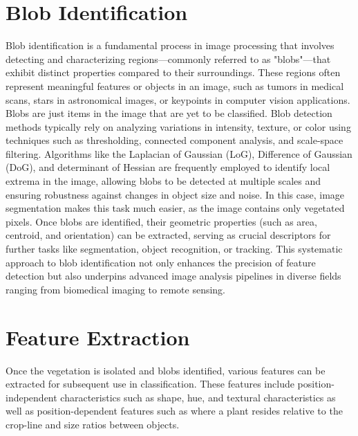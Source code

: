 \documentclass[letterpaper]{report}
\begin{document}
{\section{Blob Identification}
Blob identification is a fundamental process in image processing that involves detecting and characterizing regions—commonly referred to as "blobs"—that exhibit distinct properties compared to their surroundings. These regions often represent meaningful features or objects in an image, such as tumors in medical scans, stars in astronomical images, or keypoints in computer vision applications. Blobs are just items in the image that are yet to be classified.  Blob detection methods typically rely on analyzing variations in intensity, texture, or color using techniques such as thresholding, connected component analysis, and scale-space filtering. Algorithms like the Laplacian of Gaussian (LoG), Difference of Gaussian (DoG), and determinant of Hessian are frequently employed to identify local extrema in the image, allowing blobs to be detected at multiple scales and ensuring robustness against changes in object size and noise. In this case, image segmentation makes this task much easier, as the image contains only vegetated pixels. Once blobs are identified, their geometric properties (such as area, centroid, and orientation) can be extracted, serving as crucial descriptors for further tasks like segmentation, object recognition, or tracking. This systematic approach to blob identification not only enhances the precision of feature detection but also underpins advanced image analysis pipelines in diverse fields ranging from biomedical imaging to remote sensing.

\section{Feature Extraction}
Once the vegetation is isolated and blobs identified, various features can be extracted for subsequent use in classification. These features include position-independent characteristics such as shape, hue, and textural characteristics as well as position-dependent features such as where a plant resides relative to the crop-line and size ratios between objects.  

}
\end{document}
